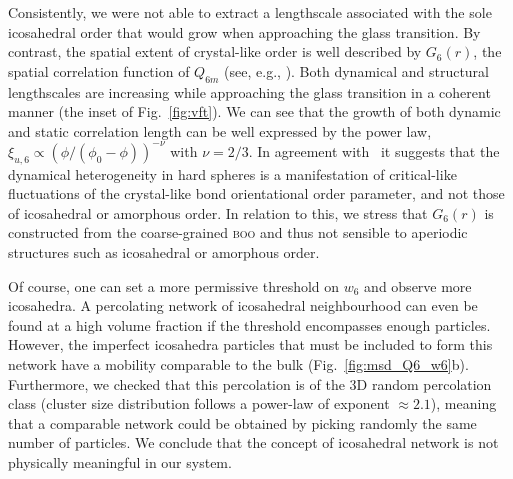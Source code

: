 Consistently, we were not able to extract a lengthscale associated with the sole icosahedral order that would grow when approaching the glass transition. By contrast, the spatial extent of crystal-like order is well described by $G_6(r)$, the spatial correlation function of $Q_{6 m}$ (see, e.g., \cite{tanaka2010critical}). Both dynamical and structural lengthscales are increasing while approaching the glass transition in a coherent manner (the inset of Fig.~\ref{fig:vft}). We can see that the growth of both dynamic and static correlation length can be well expressed by the power law,   $\xi_{u,6} \propto (\phi/(\phi_0-\phi))^{-\nu}$ with $\nu=2/3$. In agreement with~\citep{tanaka2010critical} it suggests that the dynamical heterogeneity in hard spheres is a manifestation of critical-like fluctuations of the crystal-like bond orientational order parameter, and not those of icosahedral or amorphous order. In relation to this, we stress that $G_6(r)$ is constructed from the coarse-grained \textsc{boo} and thus not sensible to aperiodic structures such as icosahedral or amorphous order. 

Of course, one can set a more permissive threshold on $w_6$ and observe more icosahedra. A percolating network of icosahedral neighbourhood can even be found at a high volume fraction if the threshold encompasses enough particles. However, the imperfect icosahedra particles that must be included to form this network have a mobility comparable to the bulk (Fig.~\ref{fig:msd_Q6_w6}b). Furthermore, we checked that this percolation is of the 3D random percolation class (cluster size distribution follows a power-law of exponent $\approx 2.1$), meaning that a comparable network could be obtained by picking randomly the same number of particles. We conclude that the concept of icosahedral network is not physically meaningful in our system.


